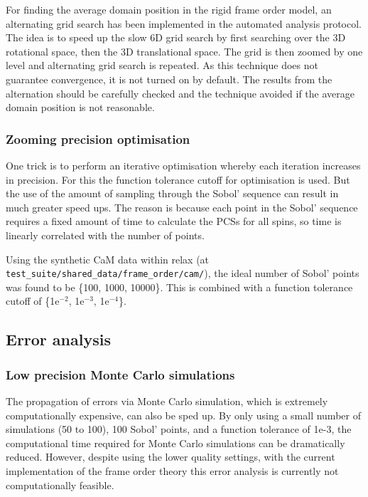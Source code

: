 For finding the average domain position in the rigid frame order model, an alternating grid search has been implemented in the automated analysis protocol.
The idea is to speed up the slow 6D grid search by first searching over the 3D rotational space, then the 3D translational space.
The grid is then zoomed by one level and alternating grid search is repeated.
As this technique does not guarantee convergence, it is not turned on by default.
The results from the alternation should be carefully checked and the technique avoided if the average domain position is not reasonable.






\subsubsection{Zooming precision optimisation}

One trick is to perform an iterative optimisation whereby each iteration increases in precision.
For this the function tolerance cutoff for optimisation is used.
But the use of the amount of sampling through the Sobol' sequence can result in much greater speed ups.
The reason is because each point in the Sobol' sequence requires a fixed amount of time to calculate the PCSs for all spins, so time is linearly correlated with the number of points.

Using the synthetic CaM data within relax (at \texttt{test\_suite/shared\_data/frame\_order/cam/}), the ideal number of Sobol' points was found to be \{100, 1000, 10000\}.
This is combined with a function tolerance cutoff of \{1e$^{-2}$, 1e$^{-3}$, 1e$^{-4}$\}.





\subsection{Error analysis}






\subsubsection{Low precision Monte Carlo simulations}

The propagation of errors via Monte Carlo simulation, which is extremely computationally expensive, can also be sped up.
By only using a small number of simulations (50 to 100), 100 Sobol' points, and a function tolerance of 1e-3, the computational time required for Monte Carlo simulations can be dramatically reduced.
However, despite using the lower quality settings, with the current implementation of the frame order theory this error analysis is currently not computationally feasible.
